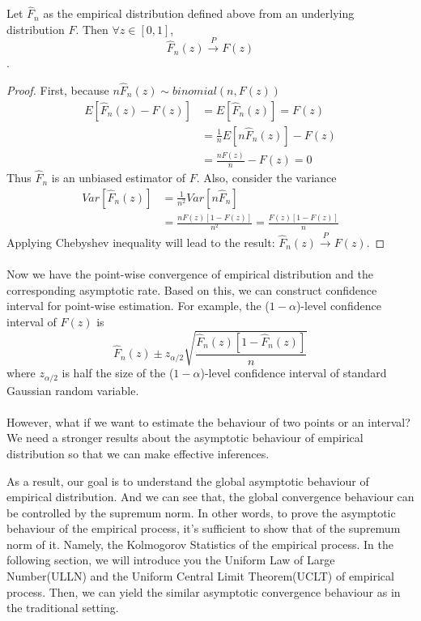 \documentclass[final_project_1.tex]{subfiles}
\begin{document}
\begin{theorem}
Let $\hat{F}_n$ as the empirical distribution defined above from an underlying distribution $F$. Then $\forall z\in [0,1]$, 
$$\hat{F}_n(z)\xrightarrow{P}F(z)$$.
\end{theorem}

\begin{proof}
First, because $n\hat{F}_n(z)\sim binomial(n,F(z))$
\begin{align*}
E[\hat{F}_n(z)-F(z)] &= E[\hat{F}_n(z)] = F(z)\\
&=\frac{1}{n}E[n\hat{F}_n(z)]-F(z)\\
&=\frac{nF(z)}{n}-F(z) = 0
\end{align*}
Thus $\hat{F}_n$ is an unbiased estimator of $F$. Also, consider the variance
\begin{align*}
Var[\hat{F}_n(z)] &= \frac{1}{n^2}Var[n\hat{F}_n]\\
&=\frac{nF(z)[1-F(z)]}{n^2} = \frac{F(z)[1-F(z)]}{n}
\end{align*}
Applying Chebyshev inequality will lead to the result: $\hat{F}_n(z)\xrightarrow{P}F(z)$.
\end{proof}

\paragraph{}
Now we have the point-wise convergence of empirical distribution and the corresponding asymptotic rate. Based on this, we can construct confidence interval for point-wise estimation. For example, the ($1-\alpha$)-level confidence interval of $F(z)$ is
$$\hat{F}_n(z) \pm z_{\alpha/2}\sqrt{\frac{\hat{F}_n(z)[1-\hat{F}_n(z)]}{n}}$$
where $z_{\alpha/2}$ is half the size of the ($1-\alpha$)-level confidence interval of standard Gaussian random variable.

\paragraph{}
However, what if we want to estimate the behaviour of two points or an interval? We need a stronger results about the asymptotic behaviour of empirical distribution so that we can make effective inferences.

As a result, our goal is to understand the global asymptotic behaviour of empirical distribution. And we can see that, the global convergence behaviour can be controlled by the supremum norm. In other words, to prove the asymptotic behaviour of the empirical process, it's sufficient to show that of the supremum norm of it. Namely, the Kolmogorov Statistics of the empirical process. In the following section, we will introduce you the Uniform Law of Large Number(ULLN) and the Uniform Central Limit Theorem(UCLT) of empirical process. Then, we can yield the similar asymptotic convergence behaviour as in the traditional setting.
\end{document}
